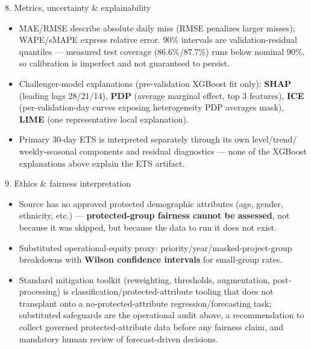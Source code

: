 \documentclass[
  ignorenonframetext,
]{beamer}
\newcounter{none} %
\providecommand{\tightlist}{%
  \setlength{\itemsep}{0pt}\setlength{\parskip}{0pt}}
\begin{document}
\begin{frame}
\begin{block}{8. Metrics, uncertainty \& explainability}
\protect{}\label{8-metrics-uncertainty--explainability}
\begin{itemize}
\tightlist
\item
  MAE/RMSE describe absolute daily miss (RMSE penalizes larger misses);
  WAPE/sMAPE express relative error. 90\% intervals are
  validation-residual quantiles --- measured test coverage
  (86.6\%/87.7\%) runs below nominal 90\%, so calibration is imperfect
  and not guaranteed to persist.
\item
  Challenger-model explanations (pre-validation XGBoost fit only):
  \textbf{SHAP} (leading lags 28/21/14), \textbf{PDP} (average marginal
  effect, top 3 features), \textbf{ICE} (per-validation-day curves
  exposing heterogeneity PDP averages mask), \textbf{LIME} (one
  representative local explanation).
\item
  Primary 30-day ETS is interpreted separately through its own
  level/trend/ weekly-seasonal components and residual diagnostics ---
  none of the XGBoost explanations above explain the ETS artifact.
\end{itemize}
\end{block}
\end{frame}

\begin{frame}
\begin{block}{9. Ethics \& fairness interpretation}
\protect{}\label{9-ethics--fairness-interpretation}
\begin{itemize}
\tightlist
\item
  Source has no approved protected demographic attributes (age, gender,
  ethnicity, etc.) --- \textbf{protected-group fairness cannot be
  assessed}, not because it was skipped, but because the data to run it
  does not exist.
\item
  Substituted operational-equity proxy:
  priority/year/masked-project-group breakdowns with \textbf{Wilson
  confidence intervals} for small-group rates.
\item
  Standard mitigation toolkit (reweighting, thresholds, augmentation,
  post-processing) is classification/protected-attribute tooling that
  does not transplant onto a no-protected-attribute
  regression/forecasting task; substituted safeguards are the
  operational audit above, a recommendation to collect governed
  protected-attribute data before any fairness claim, and mandatory
  human review of forecast-driven decisions.
\end{itemize}
\end{block}
\end{frame}
\end{document}
